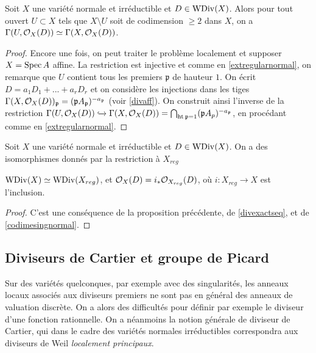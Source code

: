 \begin{prop}\label{isomorphismcodim2}
Soit $X$ une variété normale et irréductible et $D\in\operatorname{WDiv}(X)$. Alors pour tout ouvert $U\subset X$ tels que $X\setminus U$ soit de codimension $\geq 2$ dans $X$, on a $\Gamma(U,\mathcal{O}_X(D))\simeq \Gamma(X,\mathcal{O}_X(D))$.
\end{prop}
\begin{proof}
Encore une fois, on peut traiter le problème localement et supposer $X=\operatorname{Spec} A$ affine. La restriction est injective et comme en \ref{extregularnormal}, on remarque que $U$ contient tous les premiers $\mathfrak{p}$ de hauteur $1$. On écrit $D=a_1D_1+...+a_rD_r$ et on considère les injections dans les tiges $\Gamma(X,\mathcal{O}_X(D))_\mathfrak{p}=(\mathfrak{p}A_\mathfrak{p})^{-a_\mathfrak{p}}$ (voir \ref{divaff}). On construit ainsi l'inverse de la restriction $\Gamma(U, \mathcal{O}_X(D))\xhookrightarrow{}\Gamma(X,\mathcal{O}_X(D))=\bigcap_{\operatorname{ht}\mathfrak{p}=1}(\mathfrak{p}A_p)^{-a_\mathfrak{p}}$, en procédant comme en \ref{extregularnormal}.
\end{proof}

\begin{cor}\label{isomorphismcodim2CorXreg}
Soit $X$ une variété normale et irréductible et $D\in\operatorname{WDiv}(X)$. On a des isomorphismes donnés par la restriction à $X_{reg}$
\begin{center}
$\operatorname{WDiv}(X)\simeq \operatorname{WDiv}(X_{reg})$, et  $\mathcal{O}_X(D)=i_*\mathcal{O}_{X_{reg}}(D)$, où $i:X_{reg}\rightarrow X$ est l'inclusion.
\end{center}
\end{cor}
\begin{proof}
C'est une conséquence de la proposition précédente, de \ref{divexactseq}, et de \ref{codimesingnormal}.
\end{proof}

\subsection{Diviseurs de Cartier et groupe de Picard}
\label{SectionDivCartierPicardGroup}
Sur des variétés quelconques, par exemple avec des singularités, les anneaux locaux associés aux diviseurs premiers ne sont pas en général des anneaux de valuation discrète. On a alors des difficultés pour définir par exemple le diviseur d'une fonction rationnelle. On a néanmoins la notion générale de diviseur de Cartier, qui dans le cadre des variétés normales irréductibles correspondra aux diviseurs de Weil \textit{localement principaux}.

